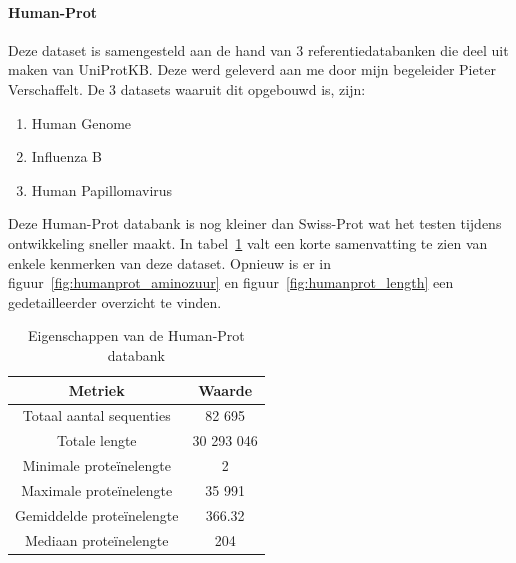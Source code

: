 \documentclass[11pt,dutch,faculty=we,layout=titlefont,underline=false,titleUppercase=true,titleUnderline=true]{ugent2016-report}
\begin{document}
    \paragraph{Human-Prot} Deze dataset is samengesteld aan de hand van 3 referentiedatabanken die deel uit maken van UniProtKB\@.
    Deze werd geleverd aan me door mijn begeleider Pieter Verschaffelt.
    De 3 datasets waaruit dit opgebouwd is, zijn:
    \begin{enumerate}
        \item Human Genome~\cite{proteomes_homo_sapiens}
        \item Influenza B~\cite{proteomes_infuenza_b}
        \item Human Papillomavirus~\cite{proteomes_human_papillomavirus}
    \end{enumerate}

    Deze Human-Prot databank is nog kleiner dan Swiss-Prot wat het testen tijdens ontwikkeling sneller maakt.
    In tabel~\ref{tab:humanprot_eigenschappen} valt een korte samenvatting te zien van enkele kenmerken van deze dataset.
    Opnieuw is er in figuur~\ref{fig:humanprot_aminozuur} en figuur~\ref{fig:humanprot_length} een gedetailleerder overzicht te vinden.

    \begin{table}[h!]
        \centering
        \begin{tabular}{ c c }
            Metriek                   & Waarde     \\
            \hline\hline
            Totaal aantal sequenties  & 82 695     \\
            Totale lengte             & 30 293 046 \\
            Minimale proteïnelengte   & 2          \\
            Maximale proteïnelengte   & 35 991     \\
            Gemiddelde proteïnelengte & 366.32     \\
            Mediaan proteïnelengte    & 204        \\
            \hline
        \end{tabular}
        \caption{Eigenschappen van de Human-Prot databank}
        \label{tab:humanprot_eigenschappen}
    \end{table}
\end{document}
